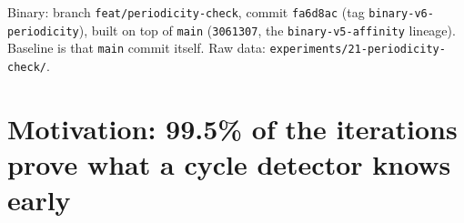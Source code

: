 \documentclass[
	english,
	letterpaper, oneside
]{article}
\begin{document}
\templatePagecfg
\templateFinalcfg

\inserttitle

\begin{center}\small\textsf{%
Binary: branch \texttt{feat/periodicity-check}, commit \texttt{fa6d8ac}
(tag \texttt{binary-v6-periodicity}), built on top of \texttt{main}
(\texttt{3061307}, the \texttt{binary-v5-affinity} lineage). Baseline is that
\texttt{main} commit itself. Raw data: \texttt{experiments/21-periodicity-check/}.%
}\end{center}

\begin{abstract}
This report implements and measures the work-reduction lever that every report
since \texttt{09-9point-sampling.tex} has pointed at: periodicity
checking in the CPU \texttt{diverge()}. A Brent-style cycle detector saves the
orbit state at doubling intervals and returns \texttt{MAXITER} as soon as the
floating-point state exactly revisits the saved state --- an
exactly-repeating orbit of a deterministic map can never escape, so the early
return is provably exact. Measured on the production spec (100 frames,
$1920\times1080$, \texttt{diffT}\,=\,0.1, \texttt{save}\,=\,1, 3 alternating
reps, on AC): CPU12 falls $164.4 \to 35.2$~s ($-78.6\%$, $4.67\times$)
and the best hybrid falls $57.6 \to 30.9$~s ($-46.3\%$, $1.86\times$) --- a
larger win than every scheduling lever combined (affinity $-3.6\%$, report~12;
second GPU $-23.2\%$, report~20), from 18 added lines in one function. The
mechanism is work elimination: the CPU pool's compute drops
$1{,}917 \to 402$~s while the 5{,}608-leaf decomposition and all 100 output
frames stay byte-identical. The hybrid queue self-rebalances --- CPU
threads, now $\sim$5$\times$ faster on interior content, take 4{,}279 regions
(was 2{,}160) and the GPU keeps only the 1{,}329 largest. The CPU pool remains
the binding resource (busiest thread 29.5~s $\approx$ wall), but what is left
on it is detection latency plus the genuinely-escaping boundary band, which no
exact early-out can skip.
\end{abstract}

\section{Motivation: 99.5\% of the iterations prove what a cycle detector knows early}
\label{sec:motivation}
\end{document}
